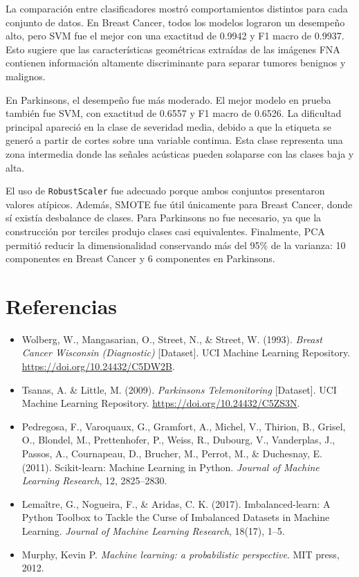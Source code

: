 \documentclass{article}
\begin{document}
La comparación entre clasificadores mostró comportamientos distintos para cada conjunto de datos. En Breast Cancer, todos los modelos lograron un desempeño alto, pero SVM fue el mejor con una exactitud de 0.9942 y F1 macro de 0.9937. Esto sugiere que las características geométricas extraídas de las imágenes FNA contienen información altamente discriminante para separar tumores benignos y malignos.

En Parkinsons, el desempeño fue más moderado. El mejor modelo en prueba también fue SVM, con exactitud de 0.6557 y F1 macro de 0.6526. La dificultad principal apareció en la clase de severidad media, debido a que la etiqueta se generó a partir de cortes sobre una variable continua. Esta clase representa una zona intermedia donde las señales acústicas pueden solaparse con las clases baja y alta.

El uso de \texttt{RobustScaler} fue adecuado porque ambos conjuntos presentaron valores atípicos. Además, SMOTE fue útil únicamente para Breast Cancer, donde sí existía desbalance de clases. Para Parkinsons no fue necesario, ya que la construcción por terciles produjo clases casi equivalentes. Finalmente, PCA permitió reducir la dimensionalidad conservando más del 95\% de la varianza: 10 componentes en Breast Cancer y 6 componentes en Parkinsons.

\section{Referencias}

    \begin{itemize}
        \item Wolberg, W., Mangasarian, O., Street, N., \& Street, W. (1993). \textit{Breast Cancer Wisconsin (Diagnostic)} [Dataset]. UCI Machine Learning Repository. \url{https://doi.org/10.24432/C5DW2B}.
        \item Tsanas, A. \& Little, M. (2009). \textit{Parkinsons Telemonitoring} [Dataset]. UCI Machine Learning Repository. \url{https://doi.org/10.24432/C5ZS3N}.
        \item Pedregosa, F., Varoquaux, G., Gramfort, A., Michel, V., Thirion, B., Grisel, O., Blondel, M., Prettenhofer, P., Weiss, R., Dubourg, V., Vanderplas, J., Passos, A., Cournapeau, D., Brucher, M., Perrot, M., \& Duchesnay, E. (2011). Scikit-learn: Machine Learning in Python. \textit{Journal of Machine Learning Research}, 12, 2825--2830.
        \item Lemaître, G., Nogueira, F., \& Aridas, C. K. (2017). Imbalanced-learn: A Python Toolbox to Tackle the Curse of Imbalanced Datasets in Machine Learning. \textit{Journal of Machine Learning Research}, 18(17), 1--5.
        \item Murphy, Kevin P. \textit{Machine learning: a probabilistic perspective}. MIT press, 2012.
    \end{itemize}
\end{document}
